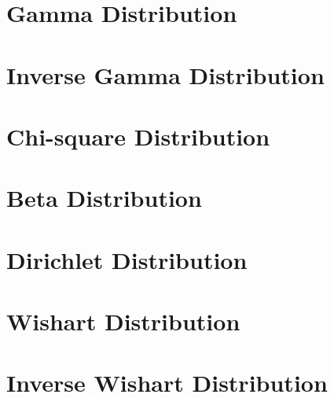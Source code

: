 \documentclass{article}
\begin{document}
\pagebreak



\section{Gamma Distribution}
\label{sec:gamma}


\section{Inverse Gamma Distribution}
\label{sec:inv_gamma}


\section{Chi-square Distribution}
\label{sec:chi2}


\section{Beta Distribution}
\label{sec:beta}


\section{Dirichlet Distribution}
\label{sec:dirichlet}


\section{Wishart Distribution}
\label{sec:wishart}


\section{Inverse Wishart Distribution}
\label{sec:inverse_wishart}



\end{document}
